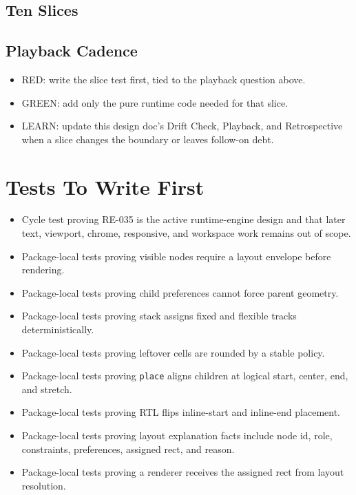 \subsection{Ten Slices}\label{record-163-ten-slices}



\subsection{Playback Cadence}\label{record-163-playback-cadence}

\begin{itemize}
\tightlist
\item
  RED: write the slice test first, tied to the playback question above.
\item
  GREEN: add only the pure runtime code needed for that slice.
\item
  LEARN: update this design doc's Drift Check, Playback, and Retrospective when a slice changes the boundary or leaves follow-on debt.
\end{itemize}

\section{Tests To Write First}\label{record-163-tests-to-write-first}

\begin{itemize}
\tightlist
\item
  Cycle test proving RE-035 is the active runtime-engine design and that later text, viewport, chrome, responsive, and workspace work remains out of scope.
\item
  Package-local tests proving visible nodes require a layout envelope before rendering.
\item
  Package-local tests proving child preferences cannot force parent geometry.
\item
  Package-local tests proving stack assigns fixed and flexible tracks deterministically.
\item
  Package-local tests proving leftover cells are rounded by a stable policy.
\item
  Package-local tests proving \texttt{p\allowbreak{}l\allowbreak{}a\allowbreak{}c\allowbreak{}e} aligns children at logical start, center, end, and stretch.
\item
  Package-local tests proving RTL flips inline-start and inline-end placement.
\item
  Package-local tests proving layout explanation facts include node id, role, constraints, preferences, assigned rect, and reason.
\item
  Package-local tests proving a renderer receives the assigned rect from layout resolution.
\end{itemize}

